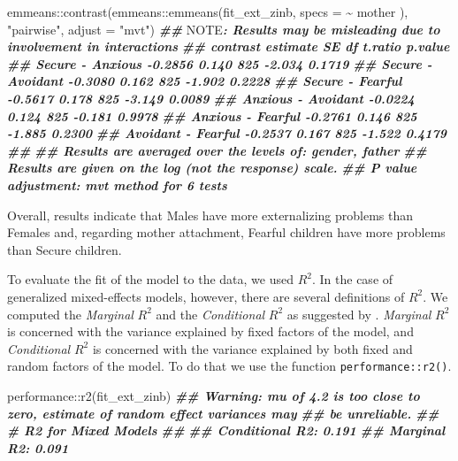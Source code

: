 \documentclass[
]{book}
\newenvironment{Shaded}{\begin{snugshade}}{\end{snugshade}}
\newcommand{\AlertTok}[1]{\textcolor[rgb]{0.94,0.16,0.16}{#1}}
\newcommand{\AttributeTok}[1]{\textcolor[rgb]{0.77,0.63,0.00}{#1}}
\newcommand{\DocumentationTok}[1]{\textcolor[rgb]{0.56,0.35,0.01}{\textbf{\textit{#1}}}}
\newcommand{\FunctionTok}[1]{\textcolor[rgb]{0.00,0.00,0.00}{#1}}
\newcommand{\NormalTok}[1]{#1}
\newcommand{\SpecialCharTok}[1]{\textcolor[rgb]{0.00,0.00,0.00}{#1}}
\newcommand{\StringTok}[1]{\textcolor[rgb]{0.31,0.60,0.02}{#1}}
\begin{document}
\begin{Shaded}
\begin{Highlighting}[]
\NormalTok{emmeans}\SpecialCharTok{::}\FunctionTok{contrast}\NormalTok{(emmeans}\SpecialCharTok{::}\FunctionTok{emmeans}\NormalTok{(fit\_ext\_zinb, }\AttributeTok{specs =} \SpecialCharTok{\textasciitilde{}}\NormalTok{ mother ),}
                  \StringTok{"pairwise"}\NormalTok{, }\AttributeTok{adjust =} \StringTok{"mvt"}\NormalTok{)}
\DocumentationTok{\#\# }\AlertTok{NOTE}\DocumentationTok{: Results may be misleading due to involvement in interactions}
\DocumentationTok{\#\#  contrast           estimate    SE  df t.ratio p.value}
\DocumentationTok{\#\#  Secure {-} Anxious    {-}0.2856 0.140 825  {-}2.034  0.1719}
\DocumentationTok{\#\#  Secure {-} Avoidant   {-}0.3080 0.162 825  {-}1.902  0.2228}
\DocumentationTok{\#\#  Secure {-} Fearful    {-}0.5617 0.178 825  {-}3.149  0.0089}
\DocumentationTok{\#\#  Anxious {-} Avoidant  {-}0.0224 0.124 825  {-}0.181  0.9978}
\DocumentationTok{\#\#  Anxious {-} Fearful   {-}0.2761 0.146 825  {-}1.885  0.2300}
\DocumentationTok{\#\#  Avoidant {-} Fearful  {-}0.2537 0.167 825  {-}1.522  0.4179}
\DocumentationTok{\#\# }
\DocumentationTok{\#\# Results are averaged over the levels of: gender, father }
\DocumentationTok{\#\# Results are given on the log (not the response) scale. }
\DocumentationTok{\#\# P value adjustment: mvt method for 6 tests}
\end{Highlighting}
\end{Shaded}

Overall, results indicate that Males have more externalizing problems than Females and, regarding mother attachment, Fearful children have more problems than Secure children.

To evaluate the fit of the model to the data, we used \(R^2\). In the case of generalized mixed-effects models, however, there are several definitions of \(R^2\). We computed the \emph{Marginal} \(R^2\) and the \emph{Conditional} \(R^2\) as suggested by \citet{nakagawaCoefficientDeterminationR22017}. \emph{Marginal} \(R^2\) is concerned with the variance explained by fixed factors of the model, and \emph{Conditional} \(R^2\) is concerned with the variance explained by both fixed and random factors of the model. To do that we use the function \texttt{performance::r2()}.

\begin{Shaded}
\begin{Highlighting}[]
\NormalTok{performance}\SpecialCharTok{::}\FunctionTok{r2}\NormalTok{(fit\_ext\_zinb)}
\DocumentationTok{\#\# Warning: mu of 4.2 is too close to zero, estimate of random effect variances may}
\DocumentationTok{\#\#   be unreliable.}
\DocumentationTok{\#\# \# R2 for Mixed Models}
\DocumentationTok{\#\# }
\DocumentationTok{\#\#   Conditional R2: 0.191}
\DocumentationTok{\#\#      Marginal R2: 0.091}
\end{Highlighting}
\end{Shaded}
\end{document}
